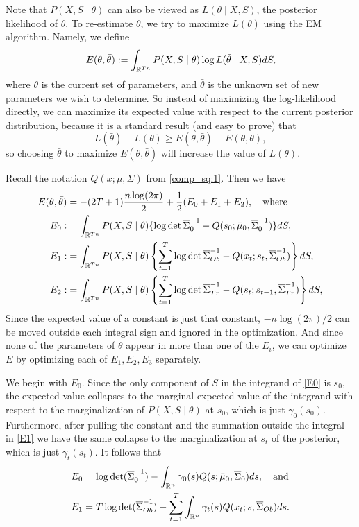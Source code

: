 \documentclass[12pt,leqno]{article}
\begin{document}
Note that $P(X,S\mid\theta)$ can also be viewed as  $L(\theta\mid X,S)$, the posterior likelihood of $\theta$.
To re-estimate $\theta$, we try to maximize $L(\theta)$ using the EM algorithm. Namely, we define 
$$
E(\theta,\bar{\theta}) := \int_{{\mathbb R}^{Tn}}P(X,S\mid\theta)\log{L(\bar{\theta}\mid X,S)}dS,
$$
where $\theta$ is the current set of parameters, and $\bar{\theta}$ is the unknown set of new parameters
we wish to determine. So instead of maximizing the log-likelihood directly, we can maximize its expected
value with respect to the current posterior distribution, because it is a standard result (and easy to prove) that
$$
L(\bar{\theta}) - L(\theta) \ge E(\theta,\bar{\theta}) - E(\theta,\theta),
$$
so choosing $\bar{\theta}$ to maximize $E(\theta,\bar{\theta})$ will increase the value of $L(\theta)$.


  
Recall the notation $Q(x;\mu,\Sigma)$ from \eqref{comp_sq:1}.  Then we have
\begin{align}
  E(\theta,\bar{\theta}) &= -(2T+1)\frac{n\log(2\pi)}{2} + \frac{1}{2}(E_0 + E_1 + E_2),\quad\text{where}\notag\\
  E_0 :&=\int_{{\mathbb R}^{Tn}}P(X,S\mid\theta)\{\log\det\overline{\Sigma}^{-1}_0 - Q(s_0;\bar{\mu}_0,\overline{\Sigma}_0^{-1})\}dS,\label{E0}\\
  E_1 :&= \int_{{\mathbb R}^{Tn}}P(X,S\mid\theta)\left\{\sum_{t=1}^T\log\det\overline{\Sigma}^{-1}_{Ob} - Q(x_t;s_t,\overline{\Sigma}_{Ob}^{-1})\right\}dS,
\label{E1}\\
  E_2 :&= \int_{{\mathbb R}^{Tn}}P(X,S\mid\theta)\left\{\sum_{t=1}^T\log\det\overline{\Sigma}^{-1}_{Tr} - Q(s_t;s_{t-1},\overline{\Sigma}_{Tr}^{-1})\right\}dS,
\label{E2}
\end{align}
Since the expected value of a constant is just that constant, $-n\log(2\pi)/2$ can be moved outside each
integral sign and ignored in the optimization.  And since none of the parameters of $\theta$ appear in more
than one of the $E_i$, we can optimize $E$ by optimizing each of $E_1,E_2,E_3$ separately.

We begin with $E_0$. Since the only component of $S$ in the integrand of \eqref{E0} is $s_0$, the expected value
collapses to the marginal 
expected value of the integrand with respect to the marginalization of $P(X,S\mid\theta)$ at $s_0$, which is just 
$\gamma_0(s_0)$.  Furthermore, after pulling the constant and the summation 
outside the integral in \eqref{E1} we have the same collapse to the marginalization at $s_t$ of the posterior, which
is just $\gamma_t(s_t)$.  It follows that
\begin{align*}
E_0 &= \log\det(\overline{\Sigma}^{-1}_0) - \int_{{\mathbb R}^n}\gamma_0(s)Q(s;\bar{\mu}_0,\overline{\Sigma}_0)ds,\quad\text{and}\\
E_1 &= T\log\det(\overline{\Sigma}^{-1}_{Ob}) - \sum_{t=1}^T\int_{{\mathbb R}^n}\gamma_t(s)Q(x_t;s,\overline{\Sigma}_{Ob})ds.
\end{align*}
\end{document}
